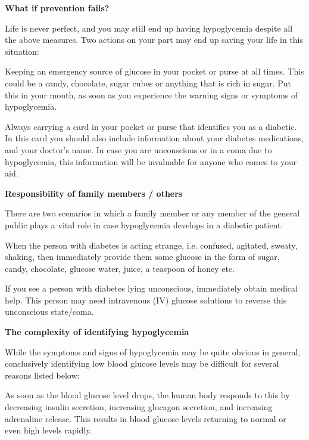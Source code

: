 
\textbf{What if prevention fails?}

Life is never perfect, and you may still end up having hypoglycemia despite all the above measures. Two actions on your part may end up saving your life in this situation:

\item Keeping an emergency source of glucose in your pocket or purse at all times. This could be a candy, chocolate, sugar cubes or anything that is rich in sugar. Put this in your mouth, as soon as you experience the warning signs or symptoms of hypoglycemia.

 \item Always carrying a card in your pocket or purse that identifies you as a diabetic. In this card you should also include information about your diabetes medications, and your doctor’s name. In case you are unconscious or in a coma due to hypoglycemia, this information will be invaluable for anyone who comes to your aid.

\textbf{Responsibility of family members / others}

There are two scenarios in which a family member or any member of the general public plays a vital role in case hypoglycemia develops in a diabetic patient:

\item When the person with diabetes is acting strange, i.e. confused, agitated, sweaty, shaking, then immediately provide them some glucose in the form of sugar, candy, chocolate, glucose water, juice, a teaspoon of honey etc.

 \item If you see a person with diabetes lying unconscious, immediately obtain medical help. This person may need intravenous (IV) glucose solutions to reverse this unconscious state/coma.


\textbf{The complexity of identifying hypoglycemia}

While the symptoms and signs of hypoglycemia may be quite obvious in general, conclusively identifying low blood glucose levels may be difficult for several reasons listed below:

\item As soon as the blood glucose level drops, the human body responds to this by decreasing insulin secretion, increasing glucagon secretion, and increasing adrenaline release. This results in blood glucose levels returning to normal or even high levels rapidly.

